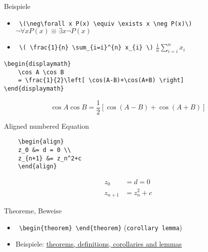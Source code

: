 \begin{frame}[fragile]{Beispiele}
    \begin{itemize}[<+->]
        \item \lstinline| \(\neg\forall x P(x) \equiv \exists x \neg P(x)\)|\is \(\neg\forall x P(x) \equiv \exists x \neg P(x)\)
        \item \lstinline| \( \frac{1}{n} \sum_{i=i}^{n} x_{i} \)|\is{} \( \frac{1}{n} \sum_{i=i}^{n} x_{i} \)
    \end{itemize}
    \begin{lstlisting}
\begin{displaymath}
    \cos A \cos B
    = \frac{1}{2}\left[ \cos(A-B)+\cos(A+B) \right]
\end{displaymath}
\end{lstlisting}
\begin{displaymath}\cos A \cos B
    = \frac{1}{2}\left[ \cos(A-B)+\cos(A+B) \right]
\end{displaymath}
\end{frame}

\begin{frame}[fragile]{Aligned numbered Equation}
    \begin{lstlisting}
    \begin{align}
    z_0 &= d = 0 \\
    z_{n+1} &= z_n^2+c
    \end{align}
    \end{lstlisting}
    \begin{align}
    z_0 &= d = 0 \\
    z_{n+1} &= z_n^2+c
    \end{align}
\end{frame}

\begin{frame}[fragile]{Theoreme, Beweise}
    \begin{itemize}[<+->]
        \item \lstinline| \begin{theorem} \end{theorem}| (\texttt{corollary lemma})
        \item Beispiele: \href{https://de.sharelatex.com/learn/Theorems_and_proofs}{theorems, definitions, corollaries and lemmas}
    \end{itemize}
\end{frame}



